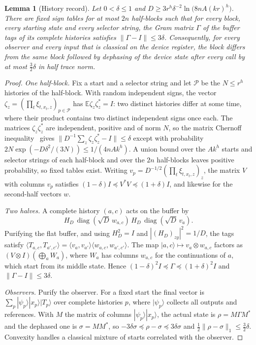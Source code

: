 \documentclass[11pt,a4paper]{article}
\theoremstyle{plain}
\newtheorem{lemma}[theorem]{Lemma}
\theoremstyle{definition}
\theoremstyle{remark}
\DeclareMathOperator{\diag}{diag}
\begin{document}
\begin{lemma}[History record]\label{lem:record}
Let $0<\delta\le1$ and $D\ge3r^h\delta^{-2}\ln\!\big(8nA(kr)^h\big)$. There are fixed sign tables for at most $2n$
half-blocks such that for every block, every starting state and every selector string, the Gram matrix $\Gamma$ of the
buffer tags of its complete histories satisfies $\|\Gamma-I\|\le3\delta$. Consequently, for every observer and every input
that is classical on the device register, the block differs from the same block followed by dephasing of the device
state after every call by at most $\frac32\delta$ in half trace norm.
\end{lemma}

\begin{proof}
\emph{One half-block.} Fix a start and a selector string and let $\mathcal P$ be the $N\le r^h$ histories of the half-block.
With random independent signs, the vector $\zeta_z=(\prod_t\xi_{t,x_t,z})_{p\in\mathcal P}$ has $\mathbb E\zeta_z\zeta_z^*=I$: two
distinct histories differ at some time, where their product contains two distinct independent signs once each. The
matrices $\zeta_z\zeta_z^*$ are independent, positive and of norm $N$, so the matrix Chernoff inequality~\cite{Tropp2012}
gives $\|D^{-1}\sum_z\zeta_z\zeta_z^*-I\|\le\delta$ except with probability $2N\exp(-D\delta^2/(3N))\le1/(4nAk^h)$. A union bound
over the $Ak^h$ starts and selector strings of each half-block and over the $2n$ half-blocks leaves positive probability,
so fixed tables exist. Writing $v_p=D^{-1/2}(\prod_t\xi_{t,x_t,z})_z$, the matrix $V$ with columns $v_p$ satisfies
$(1-\delta)I\preceq V^*V\preceq(1+\delta)I$, and likewise for the second-half vectors $w$.

\emph{Two halves.} A complete history $(a,c)$ acts on the buffer by
\[
H_D\,\diag(\sqrt D\,w_{a,c})\,H_D\,\diag(\sqrt D\,v_a).
\]
Purifying the flat buffer, and using $H_D^2=I$ and $|(H_D)_{zy}|^2=1/D$, the tags satisfy
$\langle T_{a,c},T_{a',c'}\rangle=\langle v_a,v_{a'}\rangle\langle w_{a,c},w_{a',c'}\rangle$. The map $|a,c\rangle\mapsto v_a\otimes w_{a,c}$
factors as $(V\otimes I)(\bigoplus_aW_a)$, where $W_a$ has columns $w_{a,c}$ for the continuations of $a$, which start from
its middle state. Hence $(1-\delta)^2I\preceq\Gamma\preceq(1+\delta)^2I$ and $\|\Gamma-I\|\le3\delta$.

\emph{Observers.} Purify the observer. For a fixed start the final vector is $\sum_p|\psi_p\rangle|x_p\rangle|T_p\rangle$ over complete
histories $p$, where $|\psi_p\rangle$ collects all outputs and references. With $M$ the matrix of columns $|\psi_p\rangle|x_p\rangle$,
the actual state is $\rho=M\Gamma M^*$ and the dephased one is $\sigma=MM^*$, so $-3\delta\sigma\preceq\rho-\sigma\preceq3\delta\sigma$ and
$\frac12\|\rho-\sigma\|_1\le\frac32\delta$. Convexity handles a classical mixture of starts correlated with the observer.
\end{proof}
\end{document}
